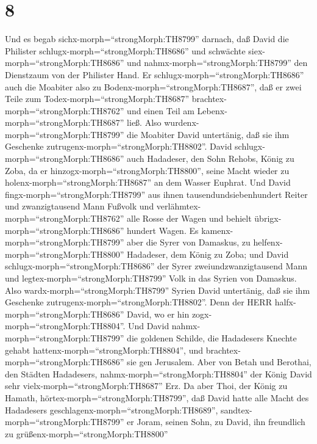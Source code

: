 \hypertarget{section-7}{%
\section{8}\label{section-7}}

 Und es begab sichx-morph=``strongMorph:TH8799'' darnach,
daß David die Philister schlugx-morph=``strongMorph:TH8686'' und
schwächte siex-morph=``strongMorph:TH8686'' und
nahmx-morph=``strongMorph:TH8799'' den Dienstzaum von der Philister
Hand.  Er schlugx-morph=``strongMorph:TH8686'' auch die
Moabiter also zu Bodenx-morph=``strongMorph:TH8687'', daß er zwei Teile
zum Todex-morph=``strongMorph:TH8687''
brachtex-morph=``strongMorph:TH8762'' und einen Teil am
Lebenx-morph=``strongMorph:TH8687'' ließ. Also
wurdenx-morph=``strongMorph:TH8799'' die Moabiter David untertänig, daß
sie ihm Geschenke zutrugenx-morph=``strongMorph:TH8802''. 
David schlugx-morph=``strongMorph:TH8686'' auch Hadadeser, den Sohn
Rehobs, König zu Zoba, da er hinzogx-morph=``strongMorph:TH8800'', seine
Macht wieder zu holenx-morph=``strongMorph:TH8687'' an dem Wasser
Euphrat.  Und David fingx-morph=``strongMorph:TH8799'' aus
ihnen tausendundsiebenhundert Reiter und zwanzigtausend Mann Fußvolk und
verlähmtex-morph=``strongMorph:TH8762'' alle Rosse der Wagen und behielt
übrigx-morph=``strongMorph:TH8686'' hundert Wagen.  Es
kamenx-morph=``strongMorph:TH8799'' aber die Syrer von Damaskus, zu
helfenx-morph=``strongMorph:TH8800'' Hadadeser, dem König zu Zoba; und
David schlugx-morph=``strongMorph:TH8686'' der Syrer
zweiundzwanzigtausend Mann  und
legtex-morph=``strongMorph:TH8799'' Volk in das Syrien von Damaskus.
Also wardx-morph=``strongMorph:TH8799'' Syrien David untertänig, daß sie
ihm Geschenke zutrugenx-morph=``strongMorph:TH8802''. Denn der HERR
halfx-morph=``strongMorph:TH8686'' David, wo er hin
zogx-morph=``strongMorph:TH8804''.  Und David
nahmx-morph=``strongMorph:TH8799'' die goldenen Schilde, die Hadadesers
Knechte gehabt hattenx-morph=``strongMorph:TH8804'', und
brachtex-morph=``strongMorph:TH8686'' sie gen Jerusalem. 
Aber von Betah und Berothai, den Städten Hadadesers,
nahmx-morph=``strongMorph:TH8804'' der König David sehr
vielx-morph=``strongMorph:TH8687'' Erz.  Da aber Thoi, der
König zu Hamath, hörtex-morph=``strongMorph:TH8799'', daß David hatte
alle Macht des Hadadesers geschlagenx-morph=``strongMorph:TH8689'',
 sandtex-morph=``strongMorph:TH8799'' er Joram, seinen
Sohn, zu David, ihn freundlich zu grüßenx-morph=``strongMorph:TH8800''
